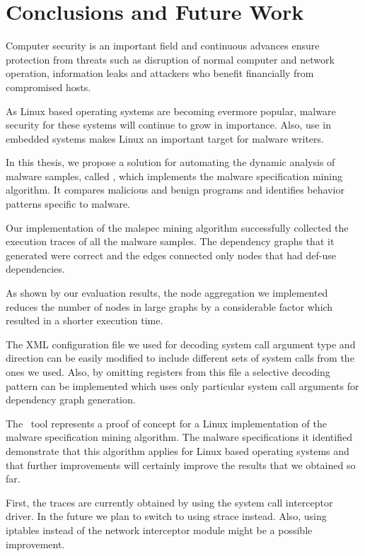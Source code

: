 \chapter{Conclusions and Future Work}
\label{chapter:sixth}

Computer security is an important field and continuous advances ensure protection from threats such as disruption of normal computer and network operation, information leaks and attackers who benefit financially from compromised hosts.

As Linux based operating systems are becoming evermore popular, malware security for these systems will continue to grow in importance. Also, use in embedded systems makes Linux an important target for malware writers.

In this thesis, we propose a solution for automating the dynamic analysis of malware samples, called \textbf{\project}, which implements the malware specification mining algorithm. It compares malicious and benign programs and identifies behavior patterns specific to malware.

Our implementation of the malspec mining algorithm successfully collected the execution traces of all the malware samples. The dependency graphs that it generated were correct and the edges connected only nodes that had def-use dependencies.

As shown by our evaluation results, the node aggregation we implemented reduces the number of nodes in large graphs by a considerable factor which resulted in a shorter execution time.

The XML configuration file we used for decoding system call argument type and direction can be easily modified to include different sets of system calls from the ones we used. Also, by omitting registers from this file a selective decoding pattern can be implemented which uses only particular system call arguments for dependency graph generation.

The \textbf{\project}\ tool represents a proof of concept for a Linux implementation of the malware specification mining algorithm. The malware specifications it identified demonstrate that this algorithm applies for Linux based operating systems and that further improvements will certainly improve the results that we obtained so far.

First, the traces are currently obtained by using the system call interceptor driver. In the future we plan to switch to using strace instead. Also, using iptables instead of the network interceptor module might be a possible improvement.

